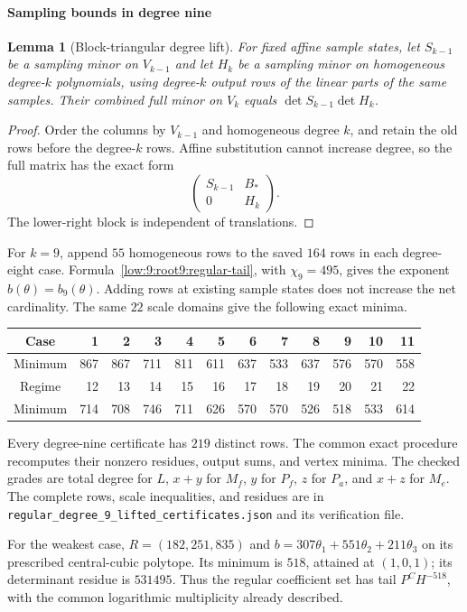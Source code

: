 \documentclass[11pt]{amsart}
\newtheorem{lemma}[theorem]{Lemma}
\theoremstyle{definition}
\theoremstyle{remark}
\numberwithin{equation}{section}
\begin{document}
\paragraph{Sampling bounds in degree nine}
\begin{lemma}[Block-triangular degree lift]
For fixed affine sample states, let $S_{k-1}$ be a sampling minor on $V_{k-1}$ and let $H_k$ be a sampling minor on homogeneous degree-$k$ polynomials, using degree-$k$ output rows of the linear parts of the same samples. Their combined full minor on $V_k$ equals $\det S_{k-1}\det H_k$.
\end{lemma}
\begin{proof}
Order the columns by $V_{k-1}$ and homogeneous degree $k$, and retain the old rows before the degree-$k$ rows. Affine substitution cannot increase degree, so the full matrix has the exact form
\[
\begin{pmatrix}S_{k-1}&B_*\\0&H_k\end{pmatrix}.
\]
The lower-right block is independent of translations.
\end{proof}

For $k=9$, append $55$ homogeneous rows to the saved $164$ rows in each degree-eight case. Formula~\eqref{low:9:root9:regular-tail}, with $\chi_9=495$, gives the exponent $b(\theta)=b_9(\theta)$. Adding rows at existing sample states does not increase the net cardinality. The same $22$ scale domains give the following exact minima.
\begin{center}
\begin{tabular}{c|rrrrrrrrrrr}
Case &1&2&3&4&5&6&7&8&9&10&11\\\hline
Minimum &867&867&711&811&611&637&533&637&576&570&558\\[3pt]
Regime &12&13&14&15&16&17&18&19&20&21&22\\\hline
Minimum &714&708&746&711&626&570&570&526&518&533&614
\end{tabular}
\end{center}

Every degree-nine certificate has $219$ distinct rows. The common exact procedure recomputes their nonzero residues, output sums, and vertex minima. The checked grades are total degree for $L$, $x+y$ for $M_f$, $y$ for $P_f$, $z$ for $P_a$, and $x+z$ for $M_e$. The complete rows, scale inequalities, and residues are in \texttt{regular\_degree\_9\_lifted\_certificates.json} and its verification file.

For the weakest case, $R=(182,251,835)$ and $b=307\theta_1+551\theta_2+211\theta_3$ on its prescribed central-cubic polytope. Its minimum is $518$, attained at $(1,0,1)$; its determinant residue is $531495$. Thus the regular coefficient set has tail $P^CH^{-518}$, with the common logarithmic multiplicity already described. 
\end{document}
